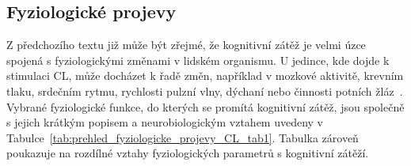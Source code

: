 \subsection{Fyziologické projevy}
\label{subsec:fyziologicke_projevy_CL}
Z předchozího textu již může být zřejmé, že kognitivní zátěž je velmi úzce
spojená s fyziologickými změnami v lidském organismu. U jedince, kde dojde k
stimulaci CL, může docházet k řadě změn, například v mozkové aktivitě, krevním
tlaku, srdečním rytmu, rychlosti pulzní vlny, dýchaní nebo činnosti potních
žláz~\cite{Vanneste2021,Haapalainen2010,Thayer2009,Gjoreski2017,Cruz2019,Brouwer2015}.
Vybrané fyziologické funkce, do kterých se promítá kognitivní zátěž, jsou
společně s jejich krátkým popisem a neurobiologickým vztahem uvedeny v
Tabulce~\ref{tab:prehled_fyziologicke_projevy_CL_tab1}. Tabulka zároveň
poukazuje na rozdílné vztahy fyziologických parametrů s kognitivní zátěží.

